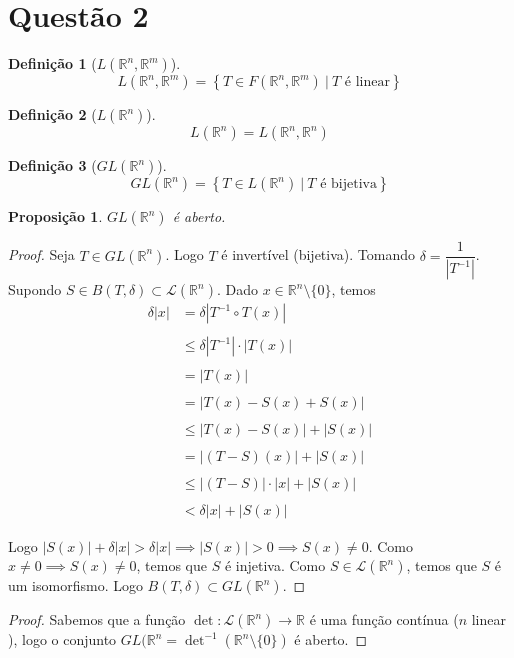 \documentclass{article}
\newtheorem{prop}{Proposição}[section]
\theoremstyle{theorem}
\theoremstyle{lemma}
\theoremstyle{definition}
\newtheorem{definicao}{Definição}[section]
\theoremstyle{remark}
\begin{document}
\section{Questão 2}
\begin{definicao}[$L(\mathbb{R}^n, \mathbb{R}^m)$]
	$$L(\mathbb{R}^n, \mathbb{R}^m) = \left\{ T \in F(\mathbb{R}^n, \mathbb{R}^m) \: | \: T \text{ é linear}\right\}$$
\end{definicao}
\begin{definicao}[$L(\mathbb{R}^n)$]
	$$L(\mathbb{R}^n) = L(\mathbb{R}^n, \mathbb{R}^n)$$
\end{definicao}
\begin{definicao}[$GL(\mathbb{R}^n)$]
	$$GL(\mathbb{R}^n) = \left\{ T \in L(\mathbb{R}^n) \: | \: T \text{ é bijetiva}\right\}$$
\end{definicao}
\begin{prop}
	$GL(\mathbb{R}^n)$ é aberto.
\end{prop}
\begin{proof}
	Seja $T\in GL(\mathbb{R}^n)$. Logo $T$ é  invertível (bijetiva). Tomando \( \delta = \dfrac{1}{|T^{-1}|} \). Supondo \( S \in B( T, \delta) \subset \mathcal{L}( \mathbb{R}^n) \). Dado \( x\in \mathbb{R}^n \setminus \{0\} \), temos 
\begin{align*}
 \delta |x| &= \delta | T^{-1}\circ T (x)| \\~\\
&\leq \delta |T^{-1}|\cdot |T(x)| \\~\\
&= |T(x)|\\~\\
&= |T(x) - S(x) + S(x) | \\~\\
&\leq |T(x) - S(x)| + |S(x) | \\~\\
&= |(T- S)(x)| + |S(x) | \\~\\
&\leq |(T- S)|\cdot |x| + |S(x) | \\~\\
&< \delta  |x| + |S(x) | 
\end{align*}

Logo \( |S(x)| + \delta |x| >  \delta|x| \implies |S(x)| > 0 \implies S(x) \neq 0 \). Como \( x\neq 0 \implies S(x) \neq 0 \), temos que \( S\) é injetiva. Como \( S \in \mathcal{L}(\mathbb{R}^n ) \), temos que \( S\) é um isomorfismo. Logo \( B(T,\delta ) \subset GL(\mathbb{R}^n ) \).
\end{proof}
\begin{proof}
	Sabemos que a função \( \det : \mathcal{L}(\mathbb{R}^n) \to \mathbb{R} \) é uma função contínua (\( n \) linear ), logo o conjunto \( GL( \mathbb{R}^n = \det^{-1}(\mathbb{R}^n \setminus \{ 0\}) \) é aberto.
\end{proof}
\end{document}
